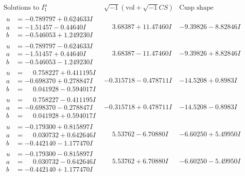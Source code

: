 \documentclass[1p]{elsarticle_modified}
\theoremstyle{definition}
\newcommand{\I}{\sqrt{-1}}
\begin{document}
$$\begin{array}{c|c|c}  
\text{Solutions to }I^u_{1}& \I (\text{vol} + \sqrt{-1}CS) & \text{Cusp shape}\\
 \hline 
\begin{aligned}
u &= -0.789797 + 0.624633 I \\
a &= -1.51457 - 0.44640 I \\
b &= -0.546053 + 1.249230 I\end{aligned}
 & \phantom{-}3.68387 + 11.47460 I & -9.39826 - 8.82846 I \\ \hline\begin{aligned}
u &= -0.789797 - 0.624633 I \\
a &= -1.51457 + 0.44640 I \\
b &= -0.546053 - 1.249230 I\end{aligned}
 & \phantom{-}3.68387 - 11.47460 I & -9.39826 + 8.82846 I \\ \hline\begin{aligned}
u &= \phantom{-}0.758227 + 0.411195 I \\
a &= -0.698370 + 0.278847 I \\
b &= \phantom{-}0.041928 - 0.594017 I\end{aligned}
 & -0.315718 - 0.478711 I & -14.5208 + 0.8983 I \\ \hline\begin{aligned}
u &= \phantom{-}0.758227 - 0.411195 I \\
a &= -0.698370 - 0.278847 I \\
b &= \phantom{-}0.041928 + 0.594017 I\end{aligned}
 & -0.315718 + 0.478711 I & -14.5208 - 0.8983 I \\ \hline\begin{aligned}
u &= -0.179300 + 0.815897 I \\
a &= \phantom{-}0.030732 + 0.642646 I \\
b &= -0.442140 - 1.177470 I\end{aligned}
 & \phantom{-}5.53762 - 6.70880 I & -6.60250 + 5.49950 I \\ \hline\begin{aligned}
u &= -0.179300 - 0.815897 I \\
a &= \phantom{-}0.030732 - 0.642646 I \\
b &= -0.442140 + 1.177470 I\end{aligned}
 & \phantom{-}5.53762 + 6.70880 I & -6.60250 - 5.49950 I \\ \hline\begin{aligned}

\end{aligned}
\end{array}$$
\end{document}
